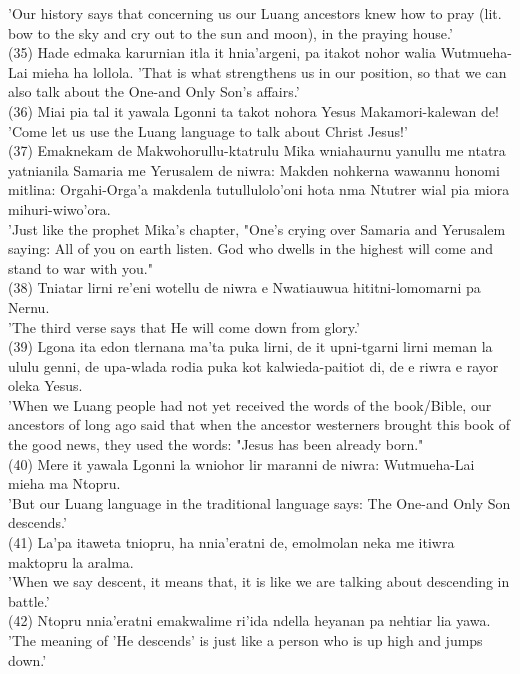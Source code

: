 \documentclass[10pt]{article}
\begin{document}
'Our history says that concerning us our Luang ancestors knew how to pray (lit. bow to the sky and cry out to the sun and moon), in the praying house.'\\
(35) Hade edmaka karurnian itla it hnia'argeni, pa itakot nohor walia Wutmueha-Lai mieha ha lollola. 'That is what strengthens us in our position, so that we can also talk about the One-and Only Son's affairs.'\\
(36) Miai pia tal it yawala Lgonni ta takot nohora Yesus Makamori-kalewan de! 'Come let us use the Luang language to talk about Christ Jesus!'\\
(37) Emaknekam de Makwohorullu-ktatrulu Mika wniahaurnu yanullu me ntatra yatnianila Samaria me Yerusalem de niwra: Makden nohkerna wawannu honomi mitlina: Orgahi-Orga'a makdenla tutullulolo'oni hota nma Ntutrer wial pia miora mihuri-wiwo'ora.\\
'Just like the prophet Mika's chapter, "One's crying over Samaria and Yerusalem saying: All of you on earth listen. God who dwells in the highest will come and stand to war with you."\\
(38) Tniatar lirni re'eni wotellu de niwra e Nwatiauwua hititni-lomomarni pa Nernu.\\
'The third verse says that He will come down from glory.'\\
(39) Lgona ita edon tlernana ma'ta puka lirni, de it upni-tgarni lirni meman la ululu genni, de upa-wlada rodia puka kot kalwieda-paitiot di, de e riwra e rayor oleka Yesus.\\
'When we Luang people had not yet received the words of the book/Bible, our ancestors of long ago said that when the ancestor westerners brought this book of the good news, they used the words: "Jesus has been already born."\\
(40) Mere it yawala Lgonni la wniohor lir maranni de niwra: Wutmueha-Lai mieha ma Ntopru.\\
'But our Luang language in the traditional language says: The One-and Only Son descends.'\\
(41) La'pa itaweta tniopru, ha nnia'eratni de, emolmolan neka me itiwra maktopru la aralma.\\
'When we say descent, it means that, it is like we are talking about descending in battle.'\\
(42) Ntopru nnia'eratni emakwalime ri'ida ndella heyanan pa nehtiar lia yawa.\\
'The meaning of 'He descends' is just like a person who is up high and jumps down.'\\
\end{document}
